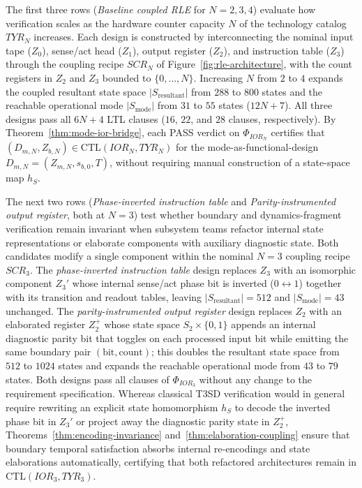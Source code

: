 The first three rows (\emph{Baseline coupled RLE} for $N=2,3,4$) evaluate how verification scales as the hardware counter capacity $N$ of the technology catalog $TYR_N$ increases. Each design is constructed by interconnecting the nominal input tape ($Z_0$), sense/act head ($Z_1$), output register ($Z_2$), and instruction table ($Z_3$) through the coupling recipe $SCR_N$ of Figure~\ref{fig:rle-architecture}, with the count registers in $Z_2$ and $Z_3$ bounded to $\{0,\dots,N\}$. Increasing $N$ from $2$ to $4$ expands the coupled resultant state space $|S_{\mathrm{resultant}}|$ from $288$ to $800$ states and the reachable operational mode $|S_{\mathrm{mode}}|$ from $31$ to $55$ states ($12N+7$). All three designs pass all $6N+4$ LTL clauses ($16$, $22$, and $28$ clauses, respectively). By Theorem~\ref{thm:mode-ior-bridge}, each PASS verdict on $\Phi_{IOR_N}$ certifies that $(D_{m,N},Z_{b,N})\in\mathrm{CTL}(IOR_N,TYR_N)$ for the mode-as-functional-design $D_{m,N}=(Z_{m,N},s_{b,0},T)$, without requiring manual construction of a state-space map $h_S$.

The next two rows (\emph{Phase-inverted instruction table} and \emph{Parity-instrumented output register}, both at $N=3$) test whether boundary and dynamics-fragment verification remain invariant when subsystem teams refactor internal state representations or elaborate components with auxiliary diagnostic state. Both candidates modify a single component within the nominal $N=3$ coupling recipe $SCR_3$. The \emph{phase-inverted instruction table} design replaces $Z_3$ with an isomorphic component $Z_3'$ whose internal sense/act phase bit is inverted ($0\leftrightarrow 1$) together with its transition and readout tables, leaving $|S_{\mathrm{resultant}}|=512$ and $|S_{\mathrm{mode}}|=43$ unchanged. The \emph{parity-instrumented output register} design replaces $Z_2$ with an elaborated register $Z_2^+$ whose state space $S_2\times\{0,1\}$ appends an internal diagnostic parity bit that toggles on each processed input bit while emitting the same boundary pair $(\text{bit},\text{count})$; this doubles the resultant state space from $512$ to $1024$ states and expands the reachable operational mode from $43$ to $79$ states. Both designs pass all clauses of $\Phi_{IOR_3}$ without any change to the requirement specification. Whereas classical T3SD verification would in general require rewriting an explicit state homomorphism $h_S$ to decode the inverted phase bit in $Z_3'$ or project away the diagnostic parity state in $Z_2^+$, Theorems~\ref{thm:encoding-invariance} and~\ref{thm:elaboration-coupling} ensure that boundary temporal satisfaction absorbs internal re-encodings and state elaborations automatically, certifying that both refactored architectures remain in $\mathrm{CTL}(IOR_3,TYR_3)$.

